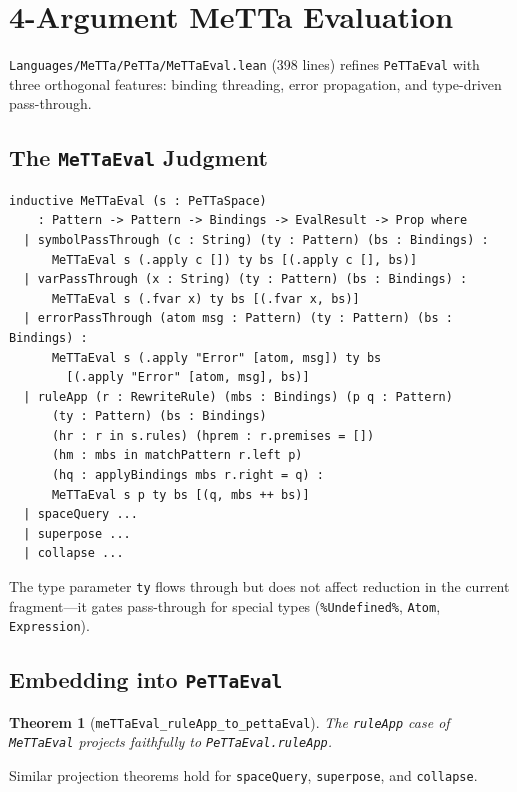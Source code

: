 \documentclass[]{article}
\newtheorem{theorem}{Theorem}
\newcommand{\code}[1]{\texttt{#1}}
\newcommand{\MeTTa}{\textup{MeTTa}}
\begin{document}
\section{4-Argument \MeTTa{} Evaluation}
\label{sec:mettaeval}

\code{Languages/MeTTa/PeTTa/MeTTaEval.lean} (398 lines) refines \code{PeTTaEval} with three
orthogonal features: binding threading, error propagation, and type-driven pass-through.

\subsection{The \code{MeTTaEval} Judgment}

\begin{lstlisting}[language=lean]
inductive MeTTaEval (s : PeTTaSpace)
    : Pattern -> Pattern -> Bindings -> EvalResult -> Prop where
  | symbolPassThrough (c : String) (ty : Pattern) (bs : Bindings) :
      MeTTaEval s (.apply c []) ty bs [(.apply c [], bs)]
  | varPassThrough (x : String) (ty : Pattern) (bs : Bindings) :
      MeTTaEval s (.fvar x) ty bs [(.fvar x, bs)]
  | errorPassThrough (atom msg : Pattern) (ty : Pattern) (bs : Bindings) :
      MeTTaEval s (.apply "Error" [atom, msg]) ty bs
        [(.apply "Error" [atom, msg], bs)]
  | ruleApp (r : RewriteRule) (mbs : Bindings) (p q : Pattern)
      (ty : Pattern) (bs : Bindings)
      (hr : r in s.rules) (hprem : r.premises = [])
      (hm : mbs in matchPattern r.left p)
      (hq : applyBindings mbs r.right = q) :
      MeTTaEval s p ty bs [(q, mbs ++ bs)]
  | spaceQuery ...
  | superpose ...
  | collapse ...
\end{lstlisting}

The type parameter \code{ty} flows through but does not affect reduction in the
current fragment---it gates pass-through for special types
(\code{\%Undefined\%}, \code{Atom}, \code{Expression}).

\subsection{Embedding into \code{PeTTaEval}}

\begin{theorem}[\code{meTTaEval\_ruleApp\_to\_pettaEval}]
The \code{ruleApp} case of \code{MeTTaEval} projects faithfully to
\code{PeTTaEval.ruleApp}.
\end{theorem}

Similar projection theorems hold for \code{spaceQuery}, \code{superpose},
and \code{collapse}.
\end{document}
